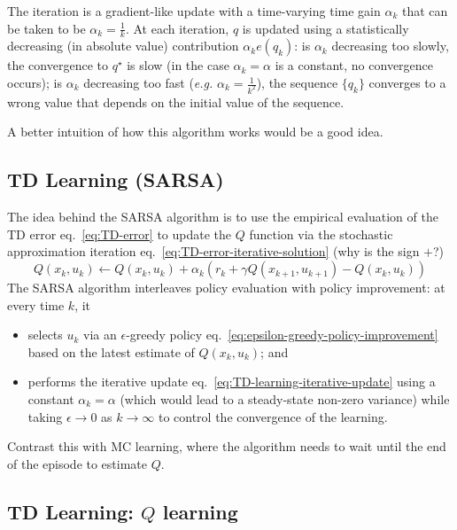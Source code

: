 The iteration is a gradient-like update with a time-varying time gain $\alpha_k$ that can be taken to be $\alpha_k = \frac{1}{k}$. At each iteration, $q$ is updated using a statistically decreasing (in absolute value) contribution $\alpha_k e(q_k)$: is $\alpha_k$ decreasing too slowly, the convergence to $q^\star$ is slow (in the case $\alpha_k=\alpha$ is a constant, no convergence occurs); is $\alpha_k$ decreasing too fast (\textit{e.g.} $\alpha_k=\tfrac{1}{k^2}$), the sequence $\{q_k\}$ converges to a wrong value that depends on the initial value of the sequence.

A better intuition of how this algorithm works would be a good idea.


\subsection{TD Learning (SARSA)}
\label{sec:TD-learning-sarsa}

The idea behind the SARSA algorithm is to use the empirical evaluation of the TD error eq.~\eqref{eq:TD-error} to update the $Q$ function via the stochastic approximation iteration eq.~\eqref{eq:TD-error-iterative-solution} (why is the sign $+$?)
\begin{equation}
  \label{eq:TD-learning-iterative-update}
  Q(x_k,u_k) \leftarrow Q(x_k,u_k) + \alpha_k\left(r_k + \gamma Q(x_{k+1},u_{k+1}) - Q(x_k,u_k)\right)
\end{equation}
The SARSA algorithm interleaves policy evaluation with policy improvement: at every time $k$, it
\begin{itemize}
\item selects $u_k$ via an $\epsilon$-greedy policy eq.~\eqref{eq:epsilon-greedy-policy-improvement} based on the latest estimate of $Q(x_k,u_k)$; and
\item performs the iterative update eq.~\eqref{eq:TD-learning-iterative-update} using a constant $\alpha_k = \alpha$ (which would lead to a steady-state non-zero variance) while taking $\epsilon\rightarrow 0$ as $k\rightarrow \infty$ to control the convergence of the learning.
\end{itemize}
Contrast this with MC learning, where the algorithm needs to wait until the end of the episode to estimate $Q$.

\subsection{TD Learning: $Q$ learning}
\label{sec:TD-learning-Q-learning}

